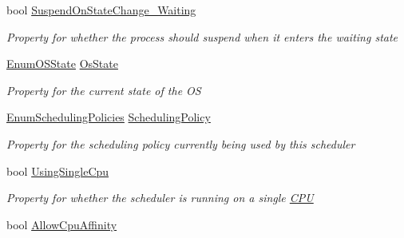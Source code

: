 \begin{DoxyCompactItemize}
bool \hyperlink{class_c_p_u___o_s___simulator_1_1_operating___system_1_1_o_s_core_a431f6636a3265ebd4c87f973b49a5195}{Suspend\+On\+State\+Change\+\_\+\+Waiting}
\begin{DoxyCompactList}\small\item\em Property for whether the process should suspend when it enters the waiting state \end{DoxyCompactList}\item 
\hyperlink{namespace_c_p_u___o_s___simulator_1_1_operating___system_a03a98a403abc737c106a8f92db5bffc1}{Enum\+O\+S\+State} \hyperlink{class_c_p_u___o_s___simulator_1_1_operating___system_1_1_o_s_core_ac620c813df8b2c9ea386cff20d3fee84}{Os\+State}
\begin{DoxyCompactList}\small\item\em Property for the current state of the O\+S \end{DoxyCompactList}\item 
\hyperlink{namespace_c_p_u___o_s___simulator_1_1_operating___system_ad0cdaacf9652394d23fa29109640fe08}{Enum\+Scheduling\+Policies} \hyperlink{class_c_p_u___o_s___simulator_1_1_operating___system_1_1_o_s_core_a265614d635fd57e6275b2bfc13d7a597}{Scheduling\+Policy}
\begin{DoxyCompactList}\small\item\em Property for the scheduling policy currently being used by this scheduler \end{DoxyCompactList}\item 
bool \hyperlink{class_c_p_u___o_s___simulator_1_1_operating___system_1_1_o_s_core_ac965e1317dc5c6b6ae93c410098dd913}{Using\+Single\+Cpu}
\begin{DoxyCompactList}\small\item\em Property for whether the scheduler is running on a single \hyperlink{namespace_c_p_u___o_s___simulator_1_1_c_p_u}{C\+P\+U} \end{DoxyCompactList}\item 
bool \hyperlink{class_c_p_u___o_s___simulator_1_1_operating___system_1_1_o_s_core_a5086a047ca75af087039e9d45ea0a6cf}{Allow\+Cpu\+Affinity}

\end{DoxyCompactItemize}
